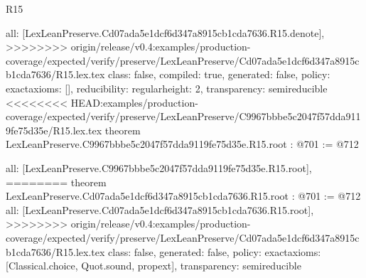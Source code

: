 \begin{lexlean}{R15}
\begin{coremodule}
{{{{{  all: [LexLeanPreserve.Cd07ada5e1dcf6d347a8915cb1cda7636.R15.denote],
>>>>>>>> origin/release/v0.4:examples/production-coverage/expected/verify/preserve/LexLeanPreserve/Cd07ada5e1dcf6d347a8915cb1cda7636/R15.lex.tex
  class: false,
  compiled: true,
  generated: false,
  policy: exact{axioms: []},
  reducibility: regular{height: 2},
  transparency: semireducible
}
<<<<<<<< HEAD:examples/production-coverage/expected/verify/preserve/LexLeanPreserve/C9967bbbe5c2047f57dda9119fe75d35e/R15.lex.tex
theorem LexLeanPreserve.C9967bbbe5c2047f57dda9119fe75d35e.R15.root : @701 := @712 {
  all: [LexLeanPreserve.C9967bbbe5c2047f57dda9119fe75d35e.R15.root],
========
theorem LexLeanPreserve.Cd07ada5e1dcf6d347a8915cb1cda7636.R15.root : @701 := @712 {
  all: [LexLeanPreserve.Cd07ada5e1dcf6d347a8915cb1cda7636.R15.root],
>>>>>>>> origin/release/v0.4:examples/production-coverage/expected/verify/preserve/LexLeanPreserve/Cd07ada5e1dcf6d347a8915cb1cda7636/R15.lex.tex
  class: false,
  generated: false,
  policy: exact{axioms: [Classical.choice, Quot.sound, propext]},
  transparency: semireducible
}

}}}}}
\end{coremodule}
\end{lexlean}
